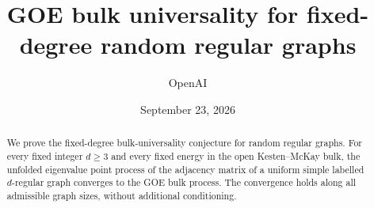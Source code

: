 \documentclass[11pt]{article}
\title{GOE bulk universality for fixed-degree random regular graphs}
\author{OpenAI}
\date{September 23, 2026}
\theoremstyle{definition}
\theoremstyle{remark}
\numberwithin{equation}{section}
\begin{document}
\maketitle
\begin{abstract}
We prove the fixed-degree bulk-universality conjecture for random regular graphs. For every fixed integer \(d\ge3\) and every fixed energy in the open Kesten--McKay bulk, the unfolded eigenvalue point process of the adjacency matrix of a uniform simple labelled \(d\)-regular graph converges to the GOE bulk process. The convergence holds along all admissible graph sizes, without additional conditioning.
\end{abstract}








\end{document}
